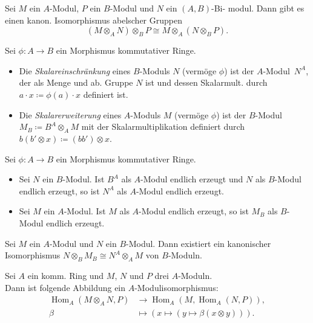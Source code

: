 \documentclass{cheat-sheet}
\DeclareMathOperator{\Hom}{Hom} %
\begin{document}
\begin{lem}
  Sei $M$ ein $A$-Modul, $P$ ein $B$-Modul und $N$ ein $(A, B)$-Bi- modul.
  Dann gibt es einen kanon. Isomorphismus abelscher Gruppen
  \[
    (M \otimes_A N) \otimes_B P \cong M \otimes_A (N \otimes_B P).
  \]
\end{lem}



\begin{defn}
  Sei $\phi : A \to B$ ein Morphismus kommutativer Ringe. \\
  \begin{itemize}
    \item Die \emph{Skalareinschränkung} eines $B$-Moduls $N$ (vermöge $\phi$) ist der $A$-Modul~$N^A$, der als Menge und ab. Gruppe $N$ ist und dessen Skalarmult. durch $a \cdot x \coloneqq \phi(a) \cdot x$ definiert ist.
    \item Die \emph{Skalarerweiterung} eines $A$-Moduls $M$ (vermöge $\phi$) ist der $B$-Modul~$M_B \coloneqq B^A \otimes_A M$ mit der Skalarmultiplikation definiert durch $b (b' \otimes x) \coloneqq (b b') \otimes x$.
  \end{itemize}
\end{defn}

\begin{prop}
  Sei $\phi : A \to B$ ein Morphismus kommutativer Ringe.
  \begin{itemize}
    \item Sei $N$ ein $B$-Modul.
    Ist $B^A$ als $A$-Modul endlich erzeugt und $N$ als $B$-Modul endlich erzeugt, so ist $N^A$ als $A$-Modul endlich erzeugt.
    \item Sei $M$ ein $A$-Modul.
    Ist $M$ als $A$-Modul endlich erzeugt, so ist $M_B$ als $B$-Modul endlich erzeugt.
  \end{itemize}
\end{prop}

\begin{lem}
  Sei $M$ ein $A$-Modul und $N$ ein $B$-Modul.
  Dann existiert ein kanonischer Isomorphismus $N \otimes_B M_B \cong N^A \otimes_A M$ von $B$-Moduln.
\end{lem}



\begin{prop}
  Sei $A$ ein komm. Ring und $M$, $N$ und $P$ drei $A$-Moduln. \\
  Dann ist folgende Abbildung ein $A$-Modulisomorphismus:
  \begin{align*}
    \Hom_A(M \otimes_A N, P) & \to \Hom_A(M, \Hom_A(N, P)), \\
    \beta & \mapsto (x \mapsto (y \mapsto \beta(x \otimes y))).
  \end{align*}
\end{prop}
\end{document}
